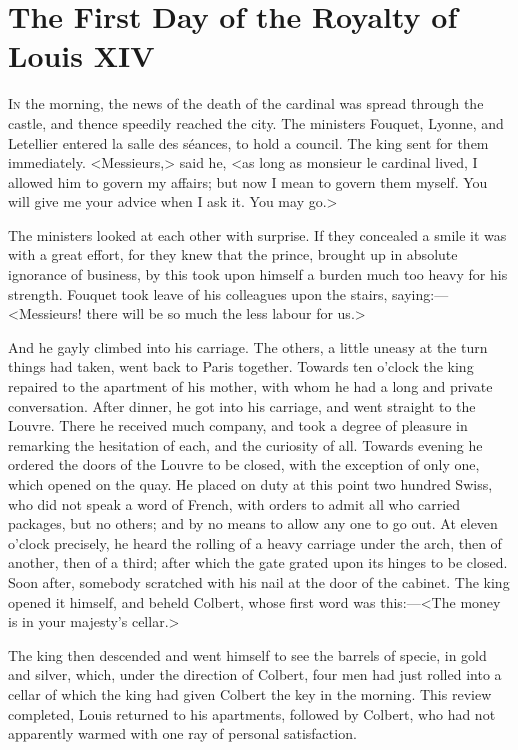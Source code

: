 \chapter{The First Day of the Royalty of Louis XIV}
\lettrine{I}{n} the morning, the news of the death of the cardinal was spread through the castle, and thence speedily reached the city. The ministers Fouquet, Lyonne, and Letellier entered la salle des séances, to hold a council. The king sent for them immediately. <Messieurs,> said he, <as long as monsieur le cardinal lived, I allowed him to govern my affairs; but now I mean to govern them myself. You will give me your advice when I ask it. You may go.>

The ministers looked at each other with surprise. If they concealed a smile it was with a great effort, for they knew that the prince, brought up in absolute ignorance of business, by this took upon himself a burden much too heavy for his strength. Fouquet took leave of his colleagues upon the stairs, saying:—<Messieurs! there will be so much the less labour for us.>

And he gayly climbed into his carriage. The others, a little uneasy at the turn things had taken, went back to Paris together. Towards ten o'clock the king repaired to the apartment of his mother, with whom he had a long and private conversation. After dinner, he got into his carriage, and went straight to the Louvre. There he received much company, and took a degree of pleasure in remarking the hesitation of each, and the curiosity of all. Towards evening he ordered the doors of the Louvre to be closed, with the exception of only one, which opened on the quay. He placed on duty at this point two hundred Swiss, who did not speak a word of French, with orders to admit all who carried packages, but no others; and by no means to allow any one to go out. At eleven o'clock precisely, he heard the rolling of a heavy carriage under the arch, then of another, then of a third; after which the gate grated upon its hinges to be closed. Soon after, somebody scratched with his nail at the door of the cabinet. The king opened it himself, and beheld Colbert, whose first word was this:—<The money is in your majesty's cellar.>

The king then descended and went himself to see the barrels of specie, in gold and silver, which, under the direction of Colbert, four men had just rolled into a cellar of which the king had given Colbert the key in the morning. This review completed, Louis returned to his apartments, followed by Colbert, who had not apparently warmed with one ray of personal satisfaction.

